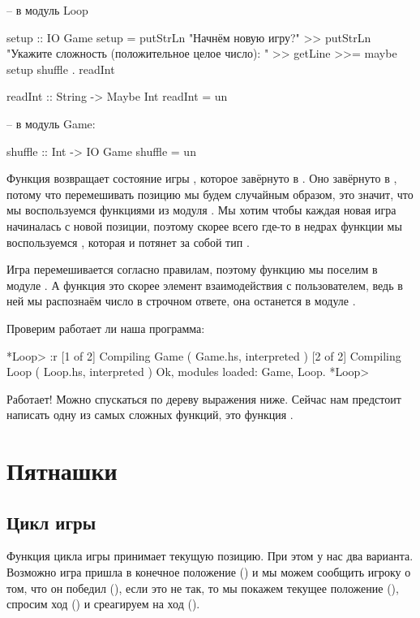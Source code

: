 \begin{code}
-- в модуль Loop

setup :: IO Game
setup = putStrLn "Начнём новую игру?" >>
    putStrLn "Укажите сложность (положительное целое число): " >>
    getLine >>= maybe setup shuffle . readInt 

readInt :: String -> Maybe Int
readInt = un

-- в модуль Game:

shuffle :: Int -> IO Game
shuffle = un
\end{code}

Функция  возвращает состояние игры , которое
завёрнуто в . Оно завёрнуто в , потому что перемешивать
позицию мы будем случайным образом, это значит, что мы воспользуемся
функциями из модуля . Мы хотим чтобы каждая новая игра
начиналась с новой позиции, поэтому скорее всего где-то в недрах функции
 мы воспользуемся , которая и потянет за собой
тип .

Игра перемешивается согласно правилам, поэтому функцию  мы
поселим в модуле . А функция  это скорее элемент
взаимодействия с пользователем, ведь в ней мы распознаём число в
строчном ответе, она останется в модуле .

Проверим работает ли наша программа:


\begin{code}
*Loop> :r
[1 of 2] Compiling Game             ( Game.hs, interpreted )
[2 of 2] Compiling Loop             ( Loop.hs, interpreted )
Ok, modules loaded: Game, Loop.
*Loop> 
\end{code}

Работает! Можно спускаться по дереву выражения ниже. Сейчас нам
предстоит написать одну из самых сложных функций, это функция
.

\section{Пятнашки}

\subsection{Цикл игры}

Функция цикла игры принимает текущую позицию. При этом у нас два
варианта. Возможно игра пришла в конечное положение () и
мы можем сообщить игроку о том, что он победил (), если
это не так, то мы покажем текущее положение (), спросим ход
() и среагируем на ход ().


